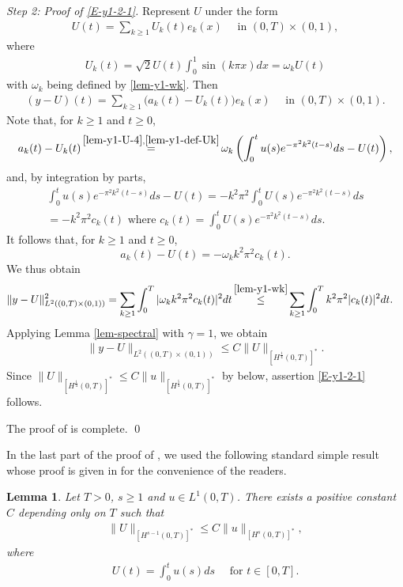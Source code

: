\documentclass[11pt, reqno]{amsart}
\theoremstyle{plain}
\newtheorem{lemma}[thm]{Lemma}
\numberwithin{equation}{section}
\begin{document}
\textit{Step 2: Proof of \eqref{E-y1-2-1}.} Represent $U$ under the form 
\begin{align*}	U(t) = \sum_{k \geq 1} U_k(t) e_k(x)	\quad \text{ in } (0, T) \times (0, 1), 
\end{align*}
where 
\begin{align} \label{lem-y1-def-Uk}	U_k(t) = \sqrt{2} U(t) \int_0^1  \sin(k \pi x) dx  = \omega_k U(t)
\end{align}
with $\omega_k$ being defined by \eqref{lem-y1-wk}. Then 
\begin{align}
	(y - U)(t) = \sum_{k \geq 1} \Big(a_k(t) - U_k(t) \Big) e_k(x) \quad \text{ in } (0, T) \times (0, 1). 
\end{align}
Note that, for $k \geq 1$ and $t \geq 0$,
$$
	 a_k(t) - U_k(t) \mathop{=}^{\eqref{lem-y1-U-4},\eqref{lem-y1-def-Uk}} \omega_k \left(\int_0^t u(s) e^{- \pi^2 k^2 (t - s)} ds - U(t) \right), 
$$
and, by integration by parts,  
\begin{multline*}
	\int_0^t u(s) e^{- \pi^2 k^2 (t - s)} ds - U(t) = - k^2 \pi^2 \int_0^t U(s) e^{- \pi^2 k^2 (t - s)} ds  \\[6pt]
	= - k^2 \pi^2 c_k(t) \mbox{ where } c_k(t) = \int_0^t U(s) e^{- \pi^2 k^2 (t - s)} ds. 
	\end{multline*}
It follows that, for $k \ge 1$ and $t \ge 0$,
$$
a_k(t)  - U(t) = - \omega_k k^2 \pi^2 c_k(t).  
$$
We thus obtain 
\begin{align*}
\|y - U\|_{L^{2}((0, T) \times (0, 1))}^2 &= \sum_{k \geq 1} \int_0^T  |\omega_k k^2 \pi^2 c_k(t)|^2 dt \mathop{\le}^{\eqref{lem-y1-wk}}  \sum_{k \geq 1} \int_0^T  k^2 \pi^2 | c_k(t)|^2 dt. 
\end{align*}
Applying Lemma \ref{lem-spectral} with $\gamma = 1$, we obtain 
\begin{align*}
	 \| y - U \|_{L^2((0, T) \times (0, 1))}  \leq C \|U\|_{[H^{\frac{1}{4}}(0, T)]^*}. 
\end{align*}
Since $ \|U\|_{[H^{\frac{1}{4}}(0, T)]^*} \le C \|u\|_{[H^{\frac{5}{4}}(0, T)]^*}$ by  below, assertion \eqref{E-y1-2-1} follows. 

\medskip 

The proof of   is complete. \qed

\medskip 
In the last part of the proof of , we used the following standard simple result whose proof is given in  for the convenience of the readers. 

\begin{lemma} \label{lem-Ueandu}Let $T>0$, $s \ge 1$ and $u \in L^1(0, T)$. There exists a positive constant $C$ depending only on $T$ such that 
\begin{align}	\label{lem-Ueandu-conclusion}
	 \|U\|_{[H^{s - 1}(0, T)]^*} \le C \| u\|_{[H^s(0, T)]^*},
\end{align}
where
\begin{align*}
	U(t) = \int_0^t u(s) ds \quad \text{ for } t \in [0, T].
\end{align*}
\end{lemma}
\end{document}
